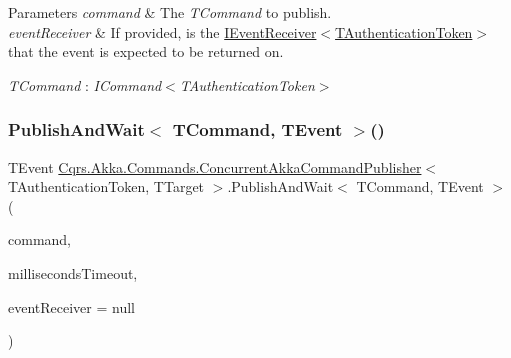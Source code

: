 \begin{DoxyParams}{Parameters}
{\em command} & The {\itshape T\+Command}  to publish.\\
\hline
{\em event\+Receiver} & If provided, is the \hyperlink{interfaceCqrs_1_1Events_1_1IEventReceiver}{I\+Event\+Receiver$<$\+T\+Authentication\+Token$>$} that the event is expected to be returned on.\\
\hline
\end{DoxyParams}
\begin{Desc}
\item[Type Constraints]\begin{description}
\item[{\em T\+Command} : {\em I\+Command$<$T\+Authentication\+Token$>$}]\end{description}
\end{Desc}
\mbox{\label{classCqrs_1_1Akka_1_1Commands_1_1ConcurrentAkkaCommandPublisher_a4a7273686d0f2af664673b74b71de019_a4a7273686d0f2af664673b74b71de019}} 
\subsubsection{\texorpdfstring{Publish\+And\+Wait$<$ T\+Command, T\+Event $>$()}{PublishAndWait< TCommand, TEvent >()}\hspace{0.1cm}{\footnotesize\ttfamily [2/6]}}
{\footnotesize\ttfamily T\+Event \hyperlink{classCqrs_1_1Akka_1_1Commands_1_1ConcurrentAkkaCommandPublisher}{Cqrs.\+Akka.\+Commands.\+Concurrent\+Akka\+Command\+Publisher}$<$ T\+Authentication\+Token, T\+Target $>$.Publish\+And\+Wait$<$ T\+Command, T\+Event $>$ (\begin{DoxyParamCaption}\item[{T\+Command}]{command,  }\item[{int}]{milliseconds\+Timeout,  }\item[{\hyperlink{interfaceCqrs_1_1Events_1_1IEventReceiver}{I\+Event\+Receiver}$<$ T\+Authentication\+Token $>$}]{event\+Receiver = {\ttfamily null} }\end{DoxyParamCaption})}



